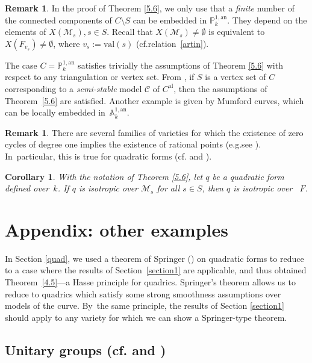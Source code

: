 \documentclass[10pt]{amsart}
\newcommand{\eg}{e.g.}
\newcommand{\cf}{cf.}
\newcommand{\al}{\mathrm{al}}
\newcommand{\val}{\mathrm{val}}
\let\backslash\setminus
\newtheorem{cor}[thm]{Corollary}
\theoremstyle{definition}
\newtheorem{rem}[thm]{Remark}
\begin{document}
\begin{rem} \label{5.7}
In the proof of Theorem \ref{5.6}, we only use that a \emph{finite} number of the connected components of $C \backslash S$ can be embedded in $\mathbb{P}_k^{1, \mathrm{an}}$. They depend on the elements of $X(\mathscr{M}_{s}), s\in S$. Recall that $X(\mathscr{M}_s) \neq \emptyset$ is equivalent to $X(F_{v_s}) \neq \emptyset$, where $v_s:=\val(s)$ (\cf relation~\eqref{artin}).

The case $C=\mathbb{P}_k^{1, \mathrm{an}}$ satisfies trivially the assumptions of Theorem \ref{5.6} with respect to any triangulation or vertex set. From \cite[4.4]{lordan}, if $S$ is a vertex set of $C$ corresponding to a \emph{semi-stable} model $\mathscr{C}$ of $C^{\al}$, then the assumptions of Theorem~\ref{5.6} are satisfied. Another example is given by Mumford curves, which can be locally embedded in~$\mathbb{A}_k^{1, \mathrm{an}}$.
\end{rem}

\begin{rem} \label{5.8}
There are several families of varieties for which the existence of zero cycles of degree one implies the existence of rational points (\eg see \cite{parimala}). In~particular, this is true for quadratic forms (\cf \cite[VI, Prop.\,1.9]{lam} and \cite{gillen}).
\end{rem}

\begin{cor} \label{5.9}
With the notation of Theorem \ref{5.6}, let $q$ be a quadratic form defined over~$k$. If $q$ is isotropic over $\mathscr{M}_{s}$ for all $s \in S$, then $q$ is isotropic over ~$F$.
\end{cor}

\section{Appendix: other examples} \label{appendix}

In Section \ref{quad}, we used a theorem of Springer (\cite[VI, Prop.\,1.9]{lam}) on quadratic forms to reduce to a case where the results of Section~\ref{section1} are applicable, and thus obtained Theorem~\ref{4.5}---a Hasse principle for quadrics. Springer's theorem allows us to reduce to quadrics which satisfy some strong smoothness assumptions over models of the curve.
By~the same principle, the results of Section \ref{section1} should apply to any variety for which we can show a Springer-type theorem.
\subsection{Unitary groups (\cf \cite{wu} and \cite[\S 12]{parsur})} \label{unitary}
\end{document}
